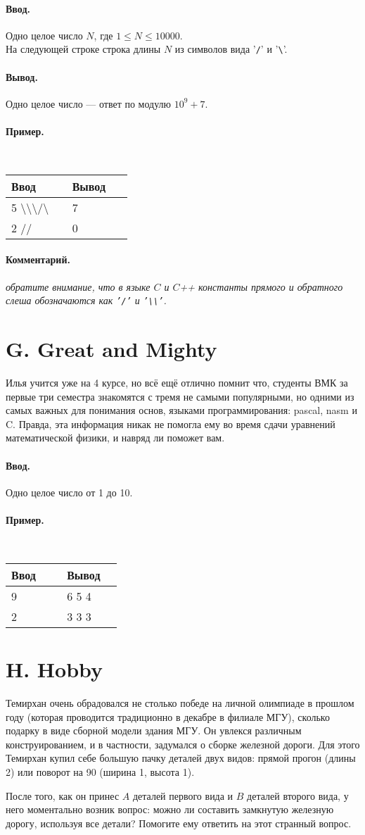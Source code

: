 \documentclass[10pt, a5paper]{article}
\newcommand{\informat}[1]
{
	\paragraph{Ввод.\\} #1
}
\newcommand{\outformat}[1]
{
	\paragraph{Вывод.\\} #1
}
\newcommand{\examplee}[4]
{
	\paragraph{Пример.\\}
	{\tt
	\begin{tabular}{|p{0.4\linewidth}|p{0.4\linewidth}|}
	\hline
	Ввод 	& Вывод  	\\
	\hline
	#1 		& #2 		\\
	\hline
	#3		& #4		\\
	\hline
	\end{tabular}
	}
}
\newcommand{\excomm}[1]
{
	\paragraph{Комментарий. \\}
	\textit{#1}
}
\begin{document}
\informat{Одно целое число $N$, где $1 \le N \le 10000$. \\
На следующей строке строка длины $N$ из символов вида  '{\tt /}' и '{\tt \textbackslash}'.}

\outformat{Одно целое число --- ответ по модулю $10^9+7$.}

\examplee{
5 \newline
\textbackslash\textbackslash\textbackslash/\textbackslash}
{7}
{2 \newline
//}
{0}

\excomm{обратите внимание, что в языке $C$ и $C$++ константы прямого и обратного слеша обозначаются как {\tt '/'} и {\tt '\textbackslash\textbackslash'}.}



\section*{G. Great and Mighty}

Илья учится уже на 4 курсе, но всё ещё отлично помнит что, студенты ВМК за первые три семестра знакомятся с тремя не самыми популярными, но одними из самых важных для понимания основ, языками программирования: pascal, nasm и C. Правда, эта информация никак не помогла ему во время сдачи уравнений математической физики, и навряд ли поможет вам.

\informat{Одно целое число от 1 до 10.}

\examplee{9}{6 5 4}{2}{3 3 3}



\section*{H. Hobby}

Темирхан очень обрадовался не столько победе на личной олимпиаде в прошлом году (которая проводится традиционно в декабре в филиале МГУ), сколько подарку в виде сборной модели здания МГУ. Он увлекся различным конструированием, и в частности, задумался о сборке железной дороги. Для этого Темирхан купил себе большую пачку деталей двух видов: прямой прогон (длины 2) или поворот на 90 (ширина 1, высота 1). 



После того, как он принес $A$ деталей первого вида и $B$ деталей второго вида, у него моментально возник вопрос: можно ли составить замкнутую железную дорогу, используя все детали? Помогите ему ответить на этот странный вопрос.
\end{document}
